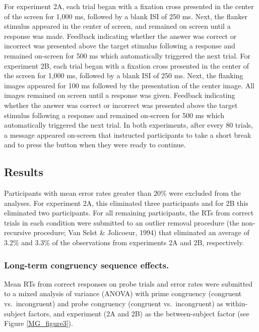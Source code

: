\documentclass[]{DissertateCUNY}
\begin{document}
For experiment 2A, each trial began with a fixation cross presented in
the center of the screen for 1,000 ms, followed by a blank ISI of 250
ms. Next, the flanker stimulus appeared in the center of screen, and
remained on screen until a response was made. Feedback indicating
whether the answer was correct or incorrect was presented above the
target stimulus following a response and remained on-screen for 500 ms
which automatically triggered the next trial. For experiment 2B, each
trial began with a fixation cross presented in the center of the screen
for 1,000 ms, followed by a blank ISI of 250 ms. Next, the flanking
images appeared for 100 ms followed by the presentation of the center
image. All images remained on screen until a response was given.
Feedback indicating whether the answer was correct or incorrect was
presented above the target stimulus following a response and remained
on-screen for 500 ms which automatically triggered the next trial. In
both experiments, after every 80 trials, a message appeared on-screen
that instructed participants to take a short break and to press the
button when they were ready to continue.

\hypertarget{results-5}{%
\subsection{Results}\label{results-5}}

Participants with mean error rates greater than 20\% were excluded from
the analyses. For experiment 2A, this eliminated three participants and
for 2B this eliminated two participants. For all remaining participants,
the RTs from correct trials in each condition were submitted to an
outlier removal procedure (the non-recursive procedure; Van Selst \&
Jolicoeur, 1994) that eliminated an average of 3.2\% and 3.3\% of the
observations from experiments 2A and 2B, respectively.

\hypertarget{long-term-congruency-sequence-effects.-1}{%
\subsubsection{Long-term congruency sequence
effects.}\label{long-term-congruency-sequence-effects.-1}}

Mean RTs from correct responses on probe trials and error rates were
submitted to a mixed analysis of variance (ANOVA) with prime congruency
(congruent vs.~incongruent) and probe congruency (congruent
vs.~incongruent) as within-subject factors, and experiment (2A and 2B)
as the between-subject factor (see Figure \ref{MG_figure3}).
\end{document}
